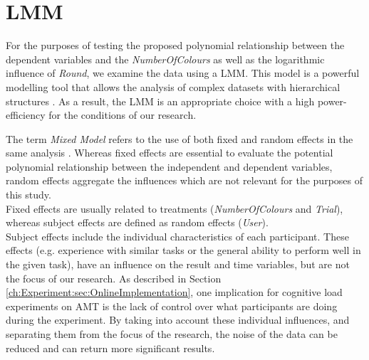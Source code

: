 \section{\acf{LMM}}
\label{ch:Evaluation:sec:LMM}

For the purposes of testing the proposed polynomial relationship between the dependent variables and the \textit{NumberOfColours} as well as the logarithmic influence of \textit{Round}, we examine the data using a \acl{LMM}. This model is a powerful modelling tool that allows the analysis of complex datasets with hierarchical structures \citep{Galecki2013}. As a result, the \acl{LMM} is an appropriate choice with a high power-efficiency for the conditions of our research.

The term \textit{Mixed Model} refers to the use of both fixed and random effects in the same analysis \citep{Seltman2012}. Whereas fixed effects are essential to evaluate the potential polynomial relationship between the independent and dependent variables, random effects aggregate the influences which are not relevant for the purposes of this study. \\ 
Fixed effects are usually related to treatments (\textit{NumberOfColours} and \textit{Trial}), whereas subject effects are defined as random effects (\textit{User}).\\
Subject effects include the individual characteristics of each participant. These effects (e.g. experience with similar tasks or the general ability to perform well in the given task), have an influence on the result and time variables, but are not the focus of our research. As described in Section \ref{ch:Experiment:sec:OnlineImplementation}, one implication for cognitive load experiments on \acf{AMT} is the lack of control over what participants are doing during the experiment. By taking into account these individual influences, and separating them from the focus of the research, the noise of the data can be reduced and can return more significant results.

